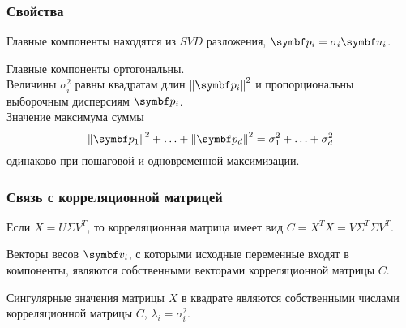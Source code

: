 \begin{frame}
  \frametitle{Свойства}

  Главные компоненты находятся из $SVD$ разложения, $\bp_i = \sigma_i \bu_i$. \pause

  Главные компоненты ортогональны. \\

  Величины $\sigma^2_i$ равны квадратам длин $\norm{\bp_i}^2$ 
  и пропорциональны выборочным дисперсиям $\bp_i$.  \\

Значение максимума суммы 
\[
  \norm{\bp_1}^2 + \ldots + \norm{\bp_d}^2 = \sigma^2_1 + \ldots + \sigma^2_d
\]
одинаково при пошаговой и одновременной максимизации.


\end{frame}


\begin{frame}
  \frametitle{Связь с корреляционной матрицей}
  Если $X = U\Sigma V^T$, то корреляционная матрица имеет вид $C=X^TX = V\Sigma^T \Sigma V^T$. \pause

  Векторы весов $\bv_i$, с которыми исходные переменные входят в компоненты, являются
  собственными векторами корреляционной матрицы $C$. \pause

  Сингулярные значения матрицы $X$ в квадрате являются собственными числами 
  корреляционной матрицы $C$, $\lambda_i = \sigma_i^2$.
  

\end{frame}